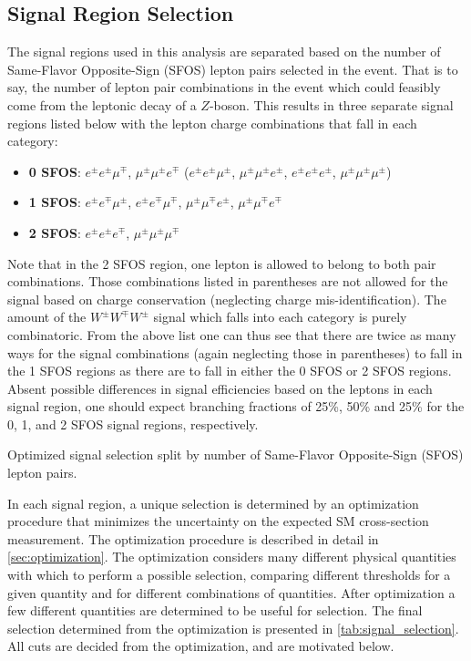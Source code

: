 \subsection{Signal Region Selection}
\label{sec:signal_regions}
The signal regions used in this analysis are separated based on the number of 
Same-Flavor Opposite-Sign (SFOS) lepton pairs selected in the event.  That is to say,
the number of lepton pair combinations in the event 
which could feasibly come from the leptonic decay of a $Z$-boson.
This results in three separate signal regions listed 
below with the lepton charge combinations
that fall in each category:
\begin{itemize}
\item \textbf{0 SFOS}: $e^{\pm}e^{\pm}\mu^{\mp}$, 
$\mu^{\pm}\mu^{\pm}e^{\mp}$ ($e^{\pm}e^{\pm}\mu^{\pm}$, 
$\mu^{\pm}\mu^{\pm}e^{\pm}$, $e^{\pm}e^{\pm}e^{\pm}$, $\mu^{\pm}\mu^{\pm}\mu^{\pm}$)
\item \textbf{1 SFOS}: $e^{\pm}e^{\mp}\mu^{\pm}$, 
$e^{\pm}e^{\mp}\mu^{\mp}$, $\mu^{\pm}\mu^{\mp}e^{\pm}$, $\mu^{\pm}\mu^{\mp}e^{\mp}$
\item \textbf{2 SFOS}: $e^{\pm}e^{\pm}e^{\mp}$, $\mu^{\pm}\mu^{\pm}\mu^{\mp}$
\end{itemize}
Note that in the 2 SFOS region, one lepton is allowed to belong to both 
pair combinations.
Those combinations listed in parentheses are not allowed for the signal 
based on charge conservation (neglecting charge mis-identification).  
The amount of the $W^{\pm}W^{\mp}W^{\pm}$ signal
which falls into each category is purely combinatoric.  
From the above list one can thus see that there are twice as many ways 
for the signal combinations (again neglecting those in parentheses)
to fall in the 1 SFOS regions as 
there are to fall in either the 0 SFOS or 2 SFOS regions. 
Absent possible differences in signal efficiencies based on the leptons in each 
signal region, one should expect branching 
fractions of 25\%, 50\% and 25\% for the 0, 1, and 2 SFOS signal regions, respectively.


\begin{table}[ht!]
\centering
\begin{small}

\end{small}
\caption{Optimized signal selection split by number of Same-Flavor 
Opposite-Sign (SFOS) lepton pairs.}
\label{tab:signal_selection}
\end{table}

In each signal region, a unique selection is determined by an optimization
procedure that minimizes the uncertainty on the expected SM cross-section
measurement. 
The optimization procedure is described in detail in \sec\ref{sec:optimization}.
The optimization considers many different physical quantities 
with which to perform a possible selection, comparing different
thresholds for a given quantity and for different combinations of 
quantities. After optimization a few different quantities
are determined to be useful for selection. 
The final selection determined from the optimization
is presented in \tab\ref{tab:signal_selection}.
All cuts are decided from the optimization, and are motivated below.

